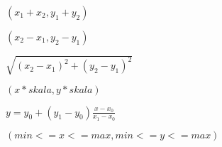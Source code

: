 \documentclass{article}
\begin{document}
$(x_1 + x_2, y_1 + y_2)$
\pagebreak

$(x_2 - x_1, y_2 - y_1)$
\pagebreak

$\sqrt{(x_2-x_1)^2+(y_2-y_1)^2}$
\pagebreak

$(x * skala, y * skala)$
\pagebreak

$y=y_0 + (y_1 - y_0)\tfrac{x-x_0}{x_1-x_0}$
\pagebreak

$(min <= x <= max, min <= y <= max)$
\pagebreak
\end{document}

